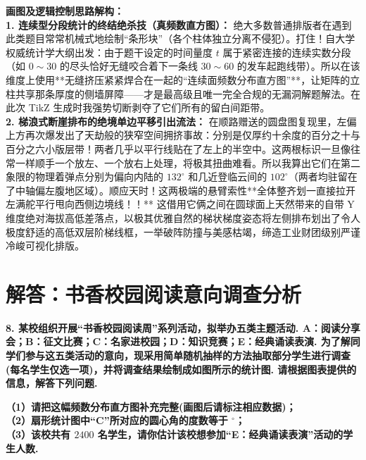 \documentclass[12pt, a4paper]{ctexrep}
\begin{document}
{\small\color{blue!70!black}
\textbf{画图及逻辑控制思路解构：}\\
\textbf{1. 连续型分段统计的终结绝杀技（真频数直方图）：} 绝大多数普通排版者在遇到此类题目常常机械式地绘制“条形块”（各个柱体独立分离不侵犯）。打住！自大学权威统计学大纲出发：由于题干设定的时间量度 $t$ 属于紧密连接的连续实数分段（如 $0{\sim}30$ 的尽头恰好无缝咬合着下一条线 $30{\sim}60$ 的发车起跑线带）。所以在该维度上使用**无缝挤压紧紧焊合在一起的“连续面频数分布直方图”**，让矩阵的立柱共享那条厚度的侧墙屏障——才是最高级且唯一完全合规的无漏洞解题解法。在此次 TikZ 生成时我强势切断剥夺了它们所有的留白间距带。\\
\textbf{2. 梯浪式断崖排布的绝境单边平移引出流法：} 在顺路赠送的圆盘图复现里，左偏上方再次爆发出了天劫般的狭窄空间拥挤事故：分别是仅厚约十余度的百分之十与百分之六小版层带！两者几乎以平行线贴在了左上的半空中。这两根标识一旦像往常一样顺手一个放左、一个放右上处理，将极其扭曲难看。所以我算出它们在第二象限的物理着弹点分别为偏向内陆的 $132^\circ$ 和几近登临云间的 $102^\circ$（两者均驻留在了中轴偏左腹地区域）。顺应天时！这两极端的悬臂索性**全体整齐划一直接拉开左满舵平行甩向西侧边境线！！** 这借用它俩之间在圆球面上天然带来的自带 Y 维度绝对海拔高低差落点，以极其优雅自然的梯状梯度姿态将左侧排布划出了令人极度舒适的高低双层阶梯线框，一举破阵防撞与美感枯竭，缔造工业财团级别严谨冷峻可视化排版。
}



\newpage

\section{解答：书香校园阅读意向调查分析}

\vspace{0.6cm}

\textbf{8. 某校组织开展“书香校园阅读周”系列活动，拟举办五类主题活动. A：阅读分享会；B：征文比赛；C：名家进校园；D：知识竞赛；E：经典诵读表演. 为了解同学们参与这五类活动的意向，现采用简单随机抽样的方法抽取部分学生进行调查(每名学生仅选一项)，并将调查结果绘制成如图所示的统计图. 请根据图表提供的信息，解答下列问题.}

\vspace{0.4cm}

\textbf{（1）请把这幅频数分布直方图补充完整(画图后请标注相应数据)；\\
（2）扇形统计图中“C”所对应的圆心角的度数等于 \underline{\makebox[1.5cm]{}}$^\circ$；\\
（3）该校共有 $2400$ 名学生，请你估计该校想参加“E：经典诵读表演”活动的学生人数.}
\end{document}
